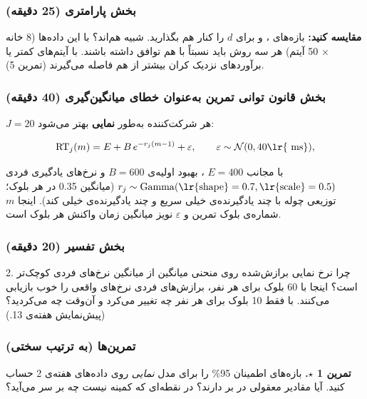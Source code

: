 \subsubsection{\texorpdfstring{بخش  پارامتری (25
دقیقه)}{بخش C: bootstrap پارامتری (25 دقیقه)}}

\textbf{مقایسه کنید:} بازه‌های ،  و 
برای \(d\) را کنار هم بگذارید. شبیه هم‌اند؟ با این داده‌ها (8 خانه × 50
آیتم) هر سه روش باید نسبتاً با هم توافق داشته باشند. با آیتم‌های کمتر یا
برآوردهای نزدیک کران بیشتر از هم فاصله می‌گیرند (تمرین 5).

\subsubsection{\texorpdfstring{بخش  قانون توانی تمرین به‌عنوان
خطای میانگین‌گیری (40
دقیقه)}{بخش D: قانون توانی تمرین به‌عنوان خطای میانگین‌گیری (40 دقیقه)}}

\(J = 20\) هر شرکت‌کننده به‌طور \textbf{نمایی} بهتر می‌شود:

\[
\mathrm{RT}_j(m) = E + B\,e^{-r_j (m-1)} + \varepsilon, \qquad \varepsilon \sim \mathcal{N}(0, 40 \text{\lr{ ms}}),
\]

با مجانب \(E = 400\) ، بهبود اولیه‌ی \(B = 600\)  و نرخ‌های
یادگیری فردی
\(r_j \sim \mathrm{Gamma}(\text{\lr{shape}} = 0.7, \text{\lr{scale}} = 0.5)\)
(میانگین 0.35 در هر بلوک؛ توزیعی چوله با چند یادگیرنده‌ی خیلی سریع و چند
یادگیرنده‌ی خیلی کند). اینجا \(m\) شماره‌ی بلوک تمرین و \(\varepsilon\)
نویز میانگین زمان واکنش هر بلوک است.

\subsubsection{\texorpdfstring{بخش  تفسیر (20
دقیقه)}{بخش E: تفسیر (20 دقیقه)}}

2. چرا نرخ نمایی برازش‌شده روی منحنی میانگین از میانگین نرخ‌های فردی
کوچک‌تر است؟ اینجا با 60 بلوک برای هر نفر، برازش‌های فردی نرخ‌های واقعی را
خوب بازیابی می‌کنند. با فقط 10 بلوک برای هر نفر چه تغییر می‌کرد و آن‌وقت چه
می‌کردید؟ (پیش‌نمایش هفته‌ی 13.)

\subsubsection{تمرین‌ها (به ترتیب سختی)}

\textbf{تمرین 1 \ensuremath{\star}.} بازه‌های اطمینان 95\%  را برای  مدل
\emph{نمایی} روی داده‌های هفته‌ی 2 حساب کنید. آیا مقادیر معقولی در بر
دارند؟ در نقطه‌ای که کمینه نیست چه بر سر  می‌آید؟


